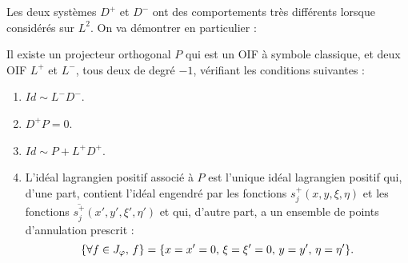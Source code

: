 Les deux systèmes $D^+$ et $D^-$ ont des comportements très différents lorsque considérés sur $L^2$. On va démontrer en particulier :

\begin{prop}
Il existe un projecteur orthogonal $P$ qui est un OIF à symbole classique, et deux OIF $L^+$ et $L^-$, tous deux de degré $-1$, vérifiant les conditions suivantes :

\begin{enumerate}
  \item $Id \sim L^-D^-$.
  \item $D^+P =0$.
  \item $Id \sim P + L^+D^+$.
  \item L'idéal lagrangien positif associé à $P$ est l'unique idéal lagrangien positif qui, d'une part, contient l'idéal engendré par les fonctions $s_j^+(x,y,\xi,\eta)$ et les fonctions $\overline{s_j^+}(x',y',\xi',\eta')$ et qui, d'autre part, a un ensemble de points d'annulation prescrit :
  \begin{equation*}
  	\{\forall f \in J_{\varphi},\, f\} = \{x=x'=0, \, \xi=\xi'=0,\, y=y',\, \eta=\eta'\}.
  \end{equation*}
\end{enumerate}
\end{prop}

